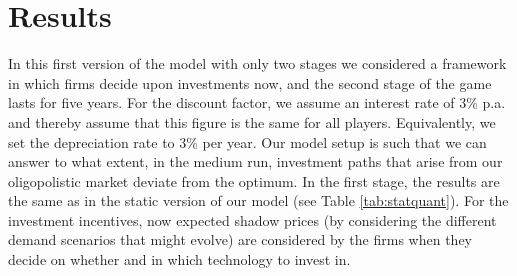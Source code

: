 \section{Results} 

In this first version of the model with only two stages we considered a framework in which firms decide upon investments now, and the second stage of the game lasts for five years. For the discount factor, we assume an interest rate of 3\% p.a. and thereby assume that this figure is the same for all players. Equivalently, we set the depreciation rate to 3\% per year. Our model setup is such that we can answer to what extent, in the medium run, investment paths that arise from our oligopolistic market deviate from the optimum. In the first stage, the results are the same as in the static version of our model (see Table \ref{tab:statquant}). For the investment incentives, now expected shadow prices (by considering the different demand scenarios that might evolve) are considered by the firms when they decide on whether and in which technology to invest in.

